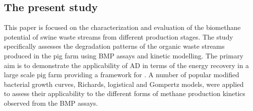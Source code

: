 \subsection{The present study}
This paper is focused on the characterization and evaluation of the biomethane potential of swine waste streams from different production stages. The study specifically assesses the degradation patterns of the organic waste streams produced in the pig farm using BMP assays and kinetic modelling. The primary aim is to demonstrate the applicability of AD in terms of the energy recovery in a large scale pig farm providing a framework for   . A number of popular modified bacterial growth curves, Richards, logistical and Gompertz models, were applied to assess their applicability to the different forms of methane production kinetics observed from the BMP assays.